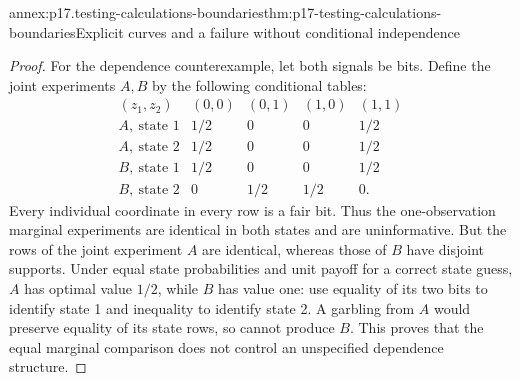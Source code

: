\begin{annexitem}{annex:p17.testing-calculations-boundaries}{thm:p17-testing-calculations-boundaries}{Explicit curves and a failure without conditional independence}
\begin{proof}
For the dependence counterexample, let both signals be bits. Define the
joint experiments \(A,B\) by the following conditional tables:
\[
 \begin{array}{c|cccc}
 (z_1,z_2)&(0,0)&(0,1)&(1,0)&(1,1)\\\hline
 A,\ \text{state 1}&1/2&0&0&1/2\\
 A,\ \text{state 2}&1/2&0&0&1/2\\
 B,\ \text{state 1}&1/2&0&0&1/2\\
 B,\ \text{state 2}&0&1/2&1/2&0 .
 \end{array}
\]
Every individual coordinate in every row is a fair bit. Thus the
one-observation marginal experiments are identical in both states
and are uninformative. But the rows of the joint experiment \(A\)
are identical, whereas those of \(B\) have disjoint supports.
Under equal state probabilities and unit payoff for a correct state guess,
\(A\) has optimal value \(1/2\), while \(B\) has value one: use equality
of its two bits to identify state 1 and inequality to identify state 2.
A garbling from \(A\) would preserve equality of its state rows, so
cannot produce \(B\). This proves that the equal marginal comparison
does not control an unspecified dependence structure.
\end{proof}
\end{annexitem}
